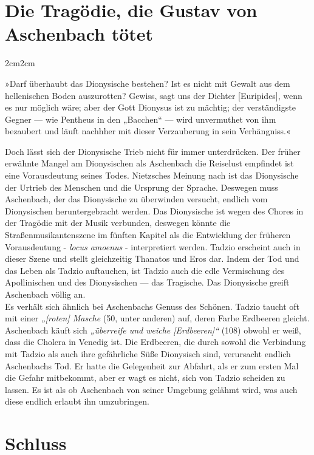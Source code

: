 \documentclass[12pt,a4paper]{article}
\newenvironment{longquote}
{%
    \vspace{-1.5em}
    \begin{adjustwidth}{2cm}{2cm}
        \fontsize{10}{12}\selectfont
        \singlespacing
        \itshape
    }
{%
    \end{adjustwidth}
}
\begin{document}
\section{Die Tragödie, die Gustav von Aschenbach tötet}

\begin{longquote}
    »Darf überhaubt das Dionysische bestehen? Ist es nicht mit Gewalt aus dem hellenischen Boden auszurotten? Gewiss, sagt uns der Dichter [Euripides], wenn es nur möglich wäre; aber der Gott Dionysus ist zu mächtig; der verständigste Gegner — wie Pentheus in den „Bacchen“ — wird unvermuthet von ihm bezaubert und läuft nachhher mit dieser Verzauberung in sein Verhängniss.«\autocite[84]{nietzsche1920}
\end{longquote}

Doch lässt sich der Dionysische Trieb nicht für immer unterdrücken. Der früher erwähnte Mangel am Dionysischen als Aschenbach die Reiselust empfindet ist eine Vorausdeutung seines Todes. Nietzsches Meinung nach ist das Dionysische der Urtrieb des Menschen und die Ursprung der Sprache. Deswegen muss Aschenbach, der das Dionysische zu überwinden versucht, endlich vom Dionysischen heruntergebracht werden. Das Dionysische ist wegen des Chores in der Tragödie mit der Musik verbunden, deswegen könnte die Straßenmusikantenszene im fünften Kapitel als die Entwicklung der früheren Vorausdeutung - \textit{locus amoenus} - interpretiert werden. Tadzio erscheint auch in dieser Szene und stellt gleichzeitig Thanatos und Eros dar. Indem der Tod und das Leben als Tadzio auftauchen, ist Tadzio auch die edle Vermischung des Apollinischen und des Dionysischen — das Tragische. Das Dionysische greift Aschenbach völlig an.\\
Es verhält sich ähnlich bei Aschenbachs Genuss des Schönen. Tadzio taucht oft mit einer \textit{„[roten] Masche} (50, unter anderen) auf, deren Farbe Erdbeeren gleicht. Aschenbach käuft sich \textit{„überreife und weiche [Erdbeeren]“} (108) obwohl er weiß, dass die Cholera in Venedig ist. Die Erdbeeren, die durch sowohl die Verbindung mit Tadzio als auch ihre gefährliche Süße Dionysisch sind, verursacht endlich Aschenbachs Tod. Er hatte die Gelegenheit zur Abfahrt, als er zum ersten Mal die Gefahr mitbekommt, aber er wagt es nicht, sich von Tadzio scheiden zu lassen. Es ist als ob Aschenbach von seiner Umgebung gelähmt wird, was auch diese endlich erlaubt ihn umzubringen.

\clearpage

\section{Schluss}
\end{document}
